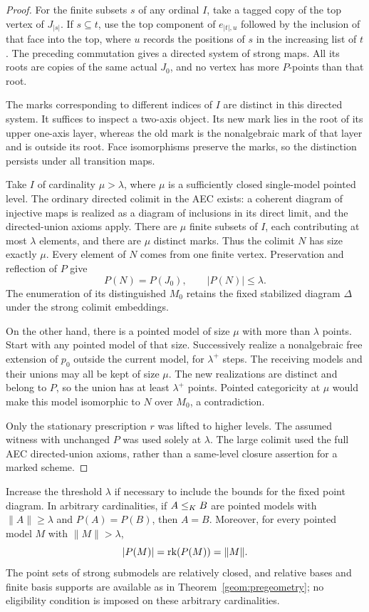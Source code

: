 \begin{proof}
For the finite subsets $s$ of any ordinal $I$, take a tagged copy of
the top vertex of $J_{|s|}$.  If $s\subseteq t$, use the top component
of $e_{|t|,u}$ followed by the inclusion of that face into the top,
where $u$ records the positions of $s$ in the increasing list of $t$.
The preceding commutation gives a directed system of strong maps.
All its roots are copies of the same actual $J_0$, and no vertex has
more $P$-points than that root.

The marks corresponding to different indices of $I$ are distinct in
this directed system.  It suffices to inspect a two-axis object.  Its
new mark lies in the root of its upper one-axis layer, whereas the
old mark is the nonalgebraic mark of that layer and is outside its
root.  Face isomorphisms preserve the marks, so the distinction
persists under all transition maps.

Take $I$ of cardinality $\mu>\lambda$, where $\mu$ is a sufficiently
closed single-model pointed level.  The ordinary directed colimit in
the AEC exists: a coherent diagram of injective maps is realized as
a diagram of inclusions in its direct limit, and the directed-union
axioms apply.  There are $\mu$ finite subsets of $I$, each contributing
at most $\lambda$ elements, and there are $\mu$ distinct marks.  Thus
the colimit $N$ has size exactly $\mu$.  Every element of $N$ comes
from one finite vertex.  Preservation and reflection of $P$ give
\[
P(N)=P(J_0),\qquad |P(N)|\leq\lambda.
\]
The enumeration of its distinguished $M_0$ retains the fixed
stabilized diagram $\Delta$ under the strong colimit embeddings.

On the other hand, there is a pointed model of size $\mu$ with more
than $\lambda$ points.  Start with any pointed model of that size.
Successively realize a nonalgebraic free extension of $p_0$ outside
the current model, for $\lambda^+$ steps.  The receiving models and
their unions may all be kept of size $\mu$.  The new realizations
are distinct and belong to $P$, so the union has at least
$\lambda^+$ points.  Pointed categoricity at $\mu$ would make this
model isomorphic to $N$ over $M_0$, a contradiction.

Only the stationary prescription $r$ was lifted to higher levels.
The assumed witness with unchanged $P$ was used solely at
$\lambda$.  The large colimit used the full AEC directed-union
axioms, rather than a same-level closure assertion for a marked
scheme.
\end{proof}

\begin{corollary}
\label{geom:tail-no-growth}
Increase the threshold $\lambda$ if necessary to include the bounds
for the fixed point diagram.  In arbitrary cardinalities, if
$A\leq_K B$ are pointed models with $\|A\|\geq\lambda$ and
$P(A)=P(B)$, then $A=B$.
Moreover, for every pointed model $M$ with $\|M\|>\lambda$,
\[
|P(M)|=\operatorname{rk}(P(M))=\|M\|.
\]
The point sets of strong submodels are relatively closed, and
relative bases and finite basis supports are available as in
Theorem~\ref{geom:pregeometry}; no eligibility condition is imposed
on these arbitrary cardinalities.
\end{corollary}

